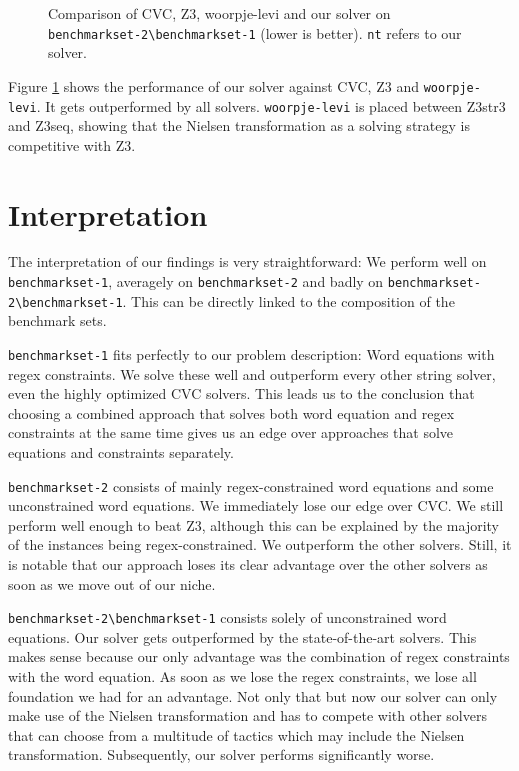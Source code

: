 \begin{figure}%
\begin{center}
\resizebox{0.6 \textwidth}{!}{

}
\caption{Comparison of CVC, Z3, woorpje-levi and our solver on \texttt{benchmarkset-2\:\textbackslash\:benchmarkset-1} (lower is better). \texttt{nt} refers to our solver.}
\label{fig:barplot-2-without-1}
\end{center}
\end{figure}

Figure \ref{fig:barplot-2-without-1} shows the performance of our solver against CVC, Z3 and \texttt{woorpje-levi}. It gets outperformed by all solvers. \texttt{woorpje-levi} is placed between Z3str3 and Z3seq, showing that the Nielsen transformation as a solving strategy is competitive with Z3.

\section{Interpretation}
The interpretation of our findings is very straightforward: We perform well on \texttt{benchmarkset-1}, averagely on \texttt{benchmarkset-2} and badly on \texttt{benchmarkset-2\:\textbackslash\:benchmarkset-1}. This can be directly linked to the composition of the benchmark sets.

\texttt{benchmarkset-1} fits perfectly to our problem description: Word equations with regex constraints. We solve these well and outperform every other string solver, even the highly optimized CVC solvers. This leads us to the conclusion that choosing a combined approach that solves both word equation and regex constraints at the same time gives us an edge over approaches that solve equations and constraints separately.

\texttt{benchmarkset-2} consists of mainly regex-constrained word equations and some unconstrained word equations. We immediately lose our edge over CVC. We still perform well enough to beat Z3, although this can be explained by the majority of the instances being regex-constrained. We outperform the other solvers. Still, it is notable that our approach loses its clear advantage over the other solvers as soon as we move out of our niche.

\texttt{benchmarkset-2\:\textbackslash\:benchmarkset-1} consists solely of unconstrained word equations. Our solver gets outperformed by the state-of-the-art solvers. This makes sense because our only advantage was the combination of regex constraints with the word equation. As soon as we lose the regex constraints, we lose all foundation we had for an advantage. Not only that but now our solver can only make use of the Nielsen transformation and has to compete with other solvers that can choose from a multitude of tactics which may include the Nielsen transformation. Subsequently, our solver performs significantly worse.

